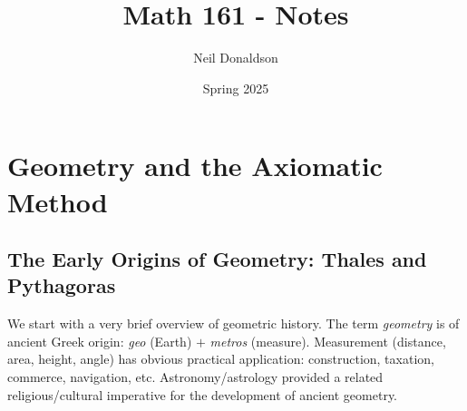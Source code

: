 \thispagestyle{empty}
\graphicspath{{1axioms/asy/}}

\title{Math 161 - Notes}
\author{Neil Donaldson}
\date{Spring 2025}
\maketitle


\section{Geometry and the Axiomatic Method}\label{chap:axioms}

\subsection{The Early Origins of Geometry: Thales and Pythagoras}\label{sec:thales}


We start with a very brief overview of geometric history. The term \emph{geometry} is of ancient Greek origin: \emph{geo} (Earth) $+$ \emph{metros} (measure). Measurement (distance, area, height, angle) has obvious practical application: construction, taxation, commerce, navigation, etc. Astronomy/astrology provided a related religious/cultural imperative for the development of ancient geometry.


